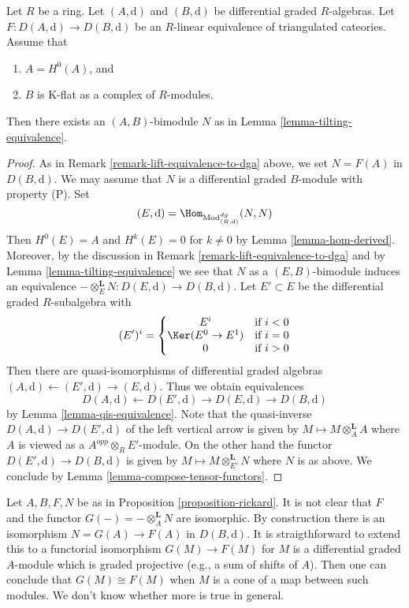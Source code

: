 \begin{proposition}
\label{proposition-rickard}
Let $R$ be a ring. Let $(A, \text{d})$ and $(B, \text{d})$ be
differential graded $R$-algebras. Let $F : D(A, \text{d}) \to D(B, \text{d})$
be an $R$-linear equivalence of triangulated cateories. Assume that
\begin{enumerate}
\item $A = H^0(A)$, and
\item $B$ is K-flat as a complex of $R$-modules.
\end{enumerate}
Then there exists an $(A, B)$-bimodule $N$ as in
Lemma \ref{lemma-tilting-equivalence}.
\end{proposition}

\begin{proof}
As in Remark \ref{remark-lift-equivalence-to-dga} above, we set $N = F(A)$
in $D(B, \text{d})$. We may assume that $N$ is a differential graded
$B$-module with property (P). Set
$$
(E, \text{d}) = \Hom_{\text{Mod}^{dg}_{(B, \text{d})}}(N, N)
$$
Then $H^0(E) = A$ and $H^k(E) = 0$ for $k \not = 0$ by
Lemma \ref{lemma-hom-derived}.
Moreover, by the discussion in Remark \ref{remark-lift-equivalence-to-dga}
and by Lemma \ref{lemma-tilting-equivalence}
we see that $N$ as a $(E, B)$-bimodule induces an
equivalence $- \otimes_E^\mathbf{L} N : D(E, \text{d}) \to D(B, \text{d})$.
Let $E' \subset E$ be the differential graded $R$-subalgebra
with
$$
(E')^i = \left\{
\begin{matrix}
E^i & \text{if }i < 0 \\
\Ker(E^0 \to E^1) & \text{if }i = 0 \\
0 & \text{if }i > 0
\end{matrix}
\right.
$$
Then there are quasi-isomorphisms of differential graded
algebras $(A, \text{d}) \leftarrow (E', \text{d}) \rightarrow (E, \text{d})$.
Thus we obtain equivalences
$$
D(A, \text{d}) \leftarrow D(E', \text{d}) \rightarrow D(E, \text{d})
\rightarrow D(B, \text{d})
$$
by Lemma \ref{lemma-qis-equivalence}.
Note that the quasi-inverse $D(A, \text{d}) \to D(E', \text{d})$
of the left vertical arrow is given
by $M \mapsto M \otimes_A^\mathbf{L} A$ where $A$ is viewed as a
$A^{opp} \otimes_R E'$-module. On the other hand the functor
$D(E', \text{d}) \to D(B, \text{d})$ is given by
$M \mapsto M \otimes_{E'}^\mathbf{L} N$ where $N$ is as above.
We conclude by Lemma \ref{lemma-compose-tensor-functors}.
\end{proof}

\begin{remark}
\label{remark-rickard}
Let $A, B, F, N$ be as in Proposition \ref{proposition-rickard}.
It is not clear that $F$ and the functor
$G(-) = - \otimes_A^\mathbf{L} N$ are isomorphic.
By construction there is an isomorphism
$N = G(A) \to F(A)$ in $D(B, \text{d})$.
It is straigthforward to extend this to a functorial isomorphism
$G(M) \to F(M)$ for $M$ is a differential graded $A$-module which
is graded projective (e.g., a sum of shifts of $A$).
Then one can conclude that $G(M) \cong F(M)$ when $M$ is a cone
of a map between such modules. We don't know whether more is true
in general.
\end{remark}

